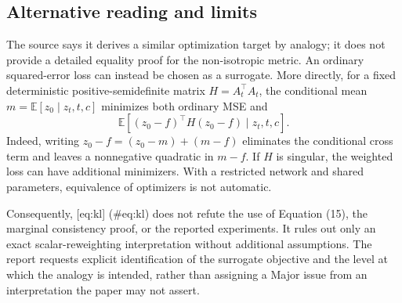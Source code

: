 \documentclass[10pt]{article}
\begin{document}
\subsection*{Alternative reading and limits}
The source says it derives a similar optimization target by analogy; it does not provide a detailed equality proof for the non-isotropic metric. An ordinary squared-error loss can instead be chosen as a surrogate. More directly, for a fixed deterministic positive-semidefinite matrix \(H=A_t^\top A_t\), the conditional mean \(m=\mathbb E[z_0\mid z_t,t,c]\) minimizes both ordinary MSE and \[\mathbb E[(z_0-f)^\top H(z_0-f)\mid z_t,t,c].\] Indeed, writing \(z_0-f=(z_0-m)+(m-f)\) eliminates the conditional cross term and leaves a nonnegative quadratic in \(m-f\). If \(H\) is singular, the weighted loss can have additional minimizers. With a restricted network and shared parameters, equivalence of optimizers is not automatic.\par
Consequently, [eq:kl] (\#eq:kl) does not refute the use of Equation (15), the marginal consistency proof, or the reported experiments. It rules out only an exact scalar-reweighting interpretation without additional assumptions. The report requests explicit identification of the surrogate objective and the level at which the analogy is intended, rather than assigning a Major issue from an interpretation the paper may not assert.\par
\end{document}
